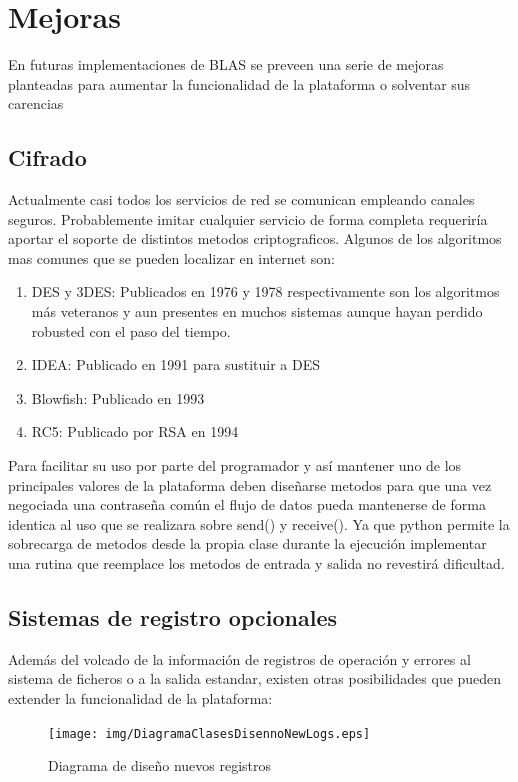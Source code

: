 \documentclass[a4paper,spanish,12pt]{book}
\begin{document}
\section{Mejoras}

En futuras implementaciones de BLAS se preveen una serie de mejoras planteadas para aumentar la funcionalidad de la plataforma o solventar sus carencias

\subsection{Cifrado}
Actualmente casi todos los servicios de red se comunican empleando canales seguros. Probablemente imitar cualquier servicio de forma completa requeriría aportar el soporte de distintos metodos criptograficos. Algunos de los algoritmos mas comunes que se pueden localizar en internet son:
\begin{enumerate}
	\item{DES y 3DES: Publicados en 1976 y 1978 respectivamente son los algoritmos más veteranos y aun presentes en muchos sistemas aunque hayan perdido robusted con el paso del tiempo.}
	\item{IDEA: Publicado en 1991 para sustituir a DES}
	\item{Blowfish: Publicado en 1993}
	\item{RC5: Publicado por RSA en 1994}
\end{enumerate}
Para facilitar su uso por parte del programador y así mantener uno de los principales valores de la plataforma deben diseñarse metodos para que una vez negociada una contraseña común el flujo de datos pueda mantenerse de forma identica al uso que se realizara sobre send() y receive(). Ya que python permite la sobrecarga de metodos desde la propia clase durante la ejecución implementar una rutina que reemplace los metodos de entrada y salida no revestirá dificultad.

\subsection{Sistemas de registro opcionales}
Además del volcado de la información de registros de operación y errores al sistema de ficheros o a la salida estandar, existen otras posibilidades que pueden extender la funcionalidad de la plataforma:
\begin{figure}[h] %
	\texttt{[image: img/DiagramaClasesDisennoNewLogs.eps]}	
              \caption{Diagrama de diseño nuevos registros}
  \label{fig:DiagramaClasesDisennoNewLog}
\end{figure}
\end{document}
